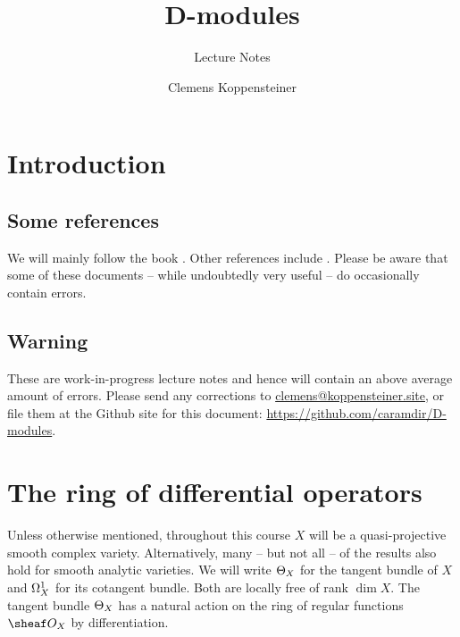 \documentclass[number-in-sections,a4paper]{notes}
\title{D-modules}
\subtitle{Lecture Notes}
\author{Clemens Koppensteiner}
\begin{document}
\maketitle

\setcounter{tocdepth}{1}
\tableofcontents

\section{Introduction}

\subsection{Some references}

We will mainly follow the book \cite{HottaTakeuchiTanisaki:2008:DModulesPerverseSheavesRepresentationTheory}.
Other references include \cite{
Arkhipov:DModules,
Bernstein:AlgebraicTheoryOfDModules,
Bjoerk:1979:RingsOfDifferentialOperators,
Borel:1987:AlgebraicDModules,
BravermanChmutova:LecturesOnAlgebraicDModules,
Ginzburg:LecturesOnDmodules,
MaisonobeSabbah:Kaiserslautern,
Mebkhout:1989:LeFormalismeDesSixOperationsPourLesDModules,
}. Please be aware that some of these documents -- while undoubtedly very useful -- do occasionally contain errors.

\subsection{Warning}

These are work-in-progress lecture notes and hence will contain an above average amount of errors.
Please send any corrections to \href{mailto:clemens@koppensteiner.site}{clemens@koppensteiner.site}, or file them at the Github site for this document: \href{https://github.com/caramdir/D-modules}{https://github.com/caramdir/D-modules}.

\section{The ring of differential operators}

Unless otherwise mentioned, throughout this course $X$ will be a quasi-projective smooth complex variety.
Alternatively, many -- but not all -- of the results also hold for smooth analytic varieties.
We will write $\Theta_{X}$ for the tangent bundle of $X$ and $\Omega^1_{X}$ for its cotangent bundle.
Both are locally free of rank $\dim  X$.
The tangent bundle $\Theta_{X}$ has a natural action on the ring of regular functions $\sO_X$ by differentiation.
\end{document}

